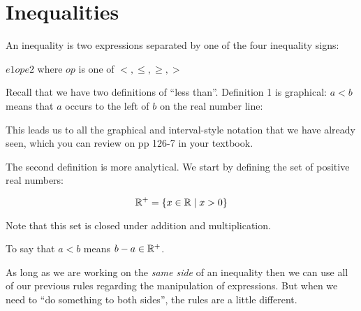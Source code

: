 \documentclass[letterpaper,12pt,fleqn]{article}
\newcommand{\Rp}{\R^+}
\begin{document}
\section*{Inequalities}

\begin{definition}
  An inequality is two expressions separated by one of the four inequality
  signs:

  $e1 op e2$ where $op$ is one of $<,\le,\ge,>$
\end{definition}

Recall that we have two definitions of ``less than''. Definition 1 is
graphical: $a<b$ means that $a$ occurs to the left of $b$ on the real number
line:

\bigskip


This leads us to all the graphical and interval-style notation that we have
already seen, which you can review on pp 126-7 in your textbook.

The second definition is more analytical. We start by defining the set of
positive real numbers:

\begin{definition}
  \[\Rp=\{x\in\R\mid x>0\}\]
\end{definition}

Note that this set is closed under addition and multiplication.

\begin{definition}
  To say that $a<b$ means $b-a\in\Rp$.
\end{definition}

As long as we are working on the \emph{same side} of an inequality then
we can use all of our previous rules regarding the manipulation of expressions.
But when we need to ``do something to both sides'', the rules are a little
different.
\end{document}
